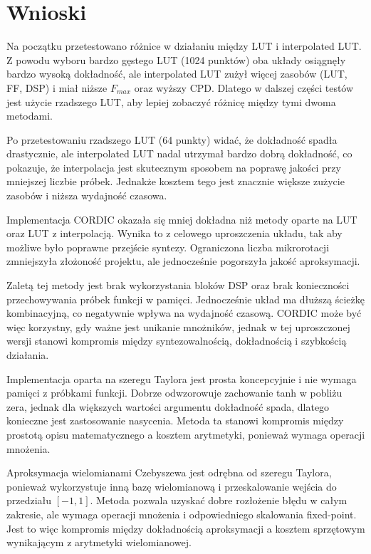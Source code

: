 \documentclass[12pt, a4paper, oneside]{scrreprt}
\begin{document}
\chapter{Wnioski}

Na początku przetestowano różnice w działaniu między LUT i interpolated LUT.
Z powodu wyboru bardzo gęstego LUT (1024 punktów) oba układy osiągnęły bardzo wysoką
dokładność, ale interpolated LUT zużył więcej zasobów (LUT, FF, DSP) i miał niższe $F_{max}$ oraz wyższy CPD.
Dlatego w dalszej części testów jest użycie rzadszego LUT, aby lepiej zobaczyć różnicę między tymi dwoma metodami.

Po przetestowaniu rzadszego LUT (64 punkty) widać, że dokładność spadła drastycznie,
ale interpolated LUT nadal utrzymał bardzo dobrą dokładność, co pokazuje, że interpolacja
jest skutecznym sposobem na poprawę jakości przy mniejszej liczbie próbek.
Jednakże kosztem tego jest znacznie większe zużycie zasobów i niższa wydajność czasowa.

Implementacja CORDIC okazała się mniej dokładna niż metody oparte na LUT oraz LUT z interpolacją.
Wynika to z celowego uproszczenia układu, tak aby możliwe było poprawne przejście syntezy.
Ograniczona liczba mikrorotacji zmniejszyła złożoność projektu, ale jednocześnie pogorszyła jakość aproksymacji.

Zaletą tej metody jest brak wykorzystania bloków DSP oraz brak konieczności przechowywania próbek funkcji w pamięci.
Jednocześnie układ ma dłuższą ścieżkę kombinacyjną, co negatywnie wpływa na wydajność czasową.
CORDIC może być więc korzystny, gdy ważne jest unikanie mnożników, jednak w
tej uproszczonej wersji stanowi kompromis między syntezowalnością, dokładnością i
szybkością działania.

Implementacja oparta na szeregu Taylora jest prosta koncepcyjnie i nie wymaga pamięci z
próbkami funkcji. Dobrze odwzorowuje zachowanie tanh w pobliżu zera, jednak dla większych
wartości argumentu dokładność spada, dlatego konieczne jest zastosowanie nasycenia.
Metoda ta stanowi kompromis między prostotą opisu matematycznego a kosztem arytmetyki,
ponieważ wymaga operacji mnożenia.

Aproksymacja wielomianami Czebyszewa jest odrębna od szeregu Taylora, ponieważ
wykorzystuje inną bazę wielomianową i przeskalowanie wejścia do przedziału $[-1, 1]$.
Metoda pozwala uzyskać dobre rozłożenie błędu w całym zakresie, ale wymaga operacji
mnożenia i odpowiedniego skalowania fixed-point. Jest to więc kompromis między dokładnością
aproksymacji a kosztem sprzętowym wynikającym z arytmetyki wielomianowej.
\end{document}
